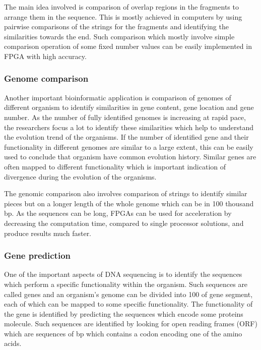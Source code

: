 \documentclass[12pt,twoside]{article}
\begin{document}
The main idea involved is comparison of overlap regions in the fragments to arrange them in the sequence. This
is mostly achieved in computers by using pairwise comparisons of the strings for the fragments and identifying
the similarities towards the end. Such comparison which mostly involve simple comparison operation of some
fixed number values can be easily implemented in FPGA with high accuracy.

\subsubsection{Genome comparison}

Another important bioinformatic application is comparison of genomes of different organism to identify similarities
in gene content, gene location and gene number. As the number of fully identified genomes is increasing at rapid pace,
the researchers focus a lot to identify these similarities which help to understand the evolution trend of the organisms.
If the number of identified gene and their functionality in different genomes are similar to a large extent, this can be
easily used to conclude that organism have common evolution history. Similar genes are often mapped to different functionality
which is important indication of divergence during the evolution of the organisms. 

The genomic comparison also involves comparison of strings to identify similar pieces but on a longer length of the whole
genome which can be in 100 thousand bp. As the sequences can be long, FPGAs can be used for acceleration by decreasing the
computation time, compared to single processor solutions, and produce results much faster.

\subsubsection{Gene prediction}

One of the important aspects of DNA sequencing is to identify the sequences which perform a specific functionality
within the organism. Such sequences are called genes and an organism's genome can be divided into 100 of gene
segment, each of which can be mapped to some specific functionality. The functionality of the gene is identified
by predicting the sequences which encode some proteins molecule. Such sequences are identified by looking for
open reading frames (ORF) which are sequences of bp which contains a codon encoding one of the amino acids.
\end{document}
